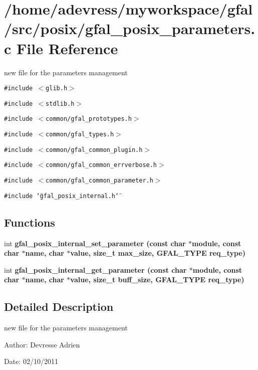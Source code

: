 \section{/home/adevress/myworkspace/gfal/src/posix/gfal\_\-posix\_\-parameters.c File Reference}
\label{gfal__posix__parameters_8c}
new file for the parameters management 

{\tt \#include $<$glib.h$>$}\par
{\tt \#include $<$stdlib.h$>$}\par
{\tt \#include $<$common/gfal\_\-prototypes.h$>$}\par
{\tt \#include $<$common/gfal\_\-types.h$>$}\par
{\tt \#include $<$common/gfal\_\-common\_\-plugin.h$>$}\par
{\tt \#include $<$common/gfal\_\-common\_\-errverbose.h$>$}\par
{\tt \#include $<$common/gfal\_\-common\_\-parameter.h$>$}\par
{\tt \#include \char`\"{}gfal\_\-posix\_\-internal.h\char`\"{}}\par
\subsection*{Functions}
\begin{CompactItemize}
\item 
int \bf{gfal\_\-posix\_\-internal\_\-set\_\-parameter} (const char $\ast$module, const char $\ast$name, char $\ast$value, size\_\-t max\_\-size, GFAL\_\-TYPE req\_\-type)
\item 
int \bf{gfal\_\-posix\_\-internal\_\-get\_\-parameter} (const char $\ast$module, const char $\ast$name, char $\ast$value, size\_\-t buff\_\-size, GFAL\_\-TYPE req\_\-type)
\end{CompactItemize}


\subsection{Detailed Description}
new file for the parameters management 

\begin{Desc}
\item[Author:]Devresse Adrien \end{Desc}
\begin{Desc}
\item[Date:]02/10/2011 \end{Desc}


